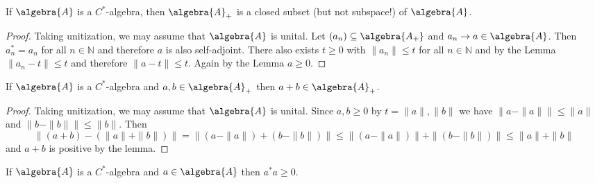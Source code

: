 \documentclass[a4paper]{article}
\begin{document}
\begin{corollary}
	If $\algebra{A}$ is a $C^*$-algebra, then $\algebra{A}_+$ is a closed subset (but not subspace!) of $\algebra{A}$.
\end{corollary}

\begin{proof}
	Taking unitization, we may assume that $\algebra{A}$ is unital.
	Let $(a_n) \subseteq \algebra{A_+}$ and $a_n \to a \in \algebra{A}$.
	Then $a_n^* = a_n$ for all $n \in \mathds{N}$ and therefore $a$ is also self-adjoint.
	There also exists $t \geq 0$ with $\|a_n\| \leq t$ for all $n \in \mathds{N}$ and by the Lemma $\|a_n - t \| \leq t$ and therefore $\|a - t\| \leq t$. 
	Again by the Lemma $a \geq 0$.
\end{proof}

\begin{corollary}
	If $\algebra{A}$ is a $C^*$-algebra and $a,b \in \algebra{A}_+$ then $a + b \in \algebra{A}_+$.
\end{corollary}

\begin{proof}
	Taking unitization, we may assume that $\algebra{A}$ is unital.
	Since $a,b \geq 0$ by $t = \|a\|, \|b\|$ we have $\|a - \|a\| \| \leq \|a\|$ and $\|b  - \|b\|\| \leq \|b\|$. Then
	\begin{equation*}
		\|(a + b) - (\|a\| + \|b\|) \| = \|(a - \|a\|)	+ (b - \|b\|)\|  \leq \|(a - \|a\|)\|	+ \|(b - \|b\|)\| \leq \|a\| + \|b\|
	\end{equation*}	
	and $a + b$ is positive by the lemma.
\end{proof}

\begin{theorem}
	If $\algebra{A}$ is a $C^*$-algebra and $a \in \algebra{A}$ then $a^* a \geq 0$.
\end{theorem}
\end{document}
